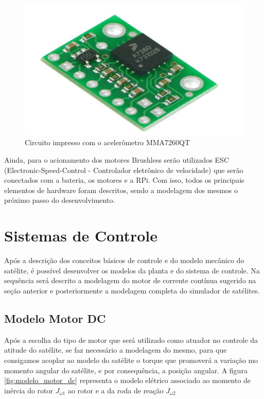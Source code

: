 \begin{figure}[H]
  \caption{Circuito impresso com o acelerômetro MMA7260QT}
  \begin{center}
      \includegraphics[scale=.4]{img/pci_acelerometro_calache_p22}
  \end{center}
  \label{fig:pci_acelerometro_calache_p22}
\end{figure}

Ainda, para o acionamento dos motores Brushless serão utilizados ESC (Electronic-Speed-Control - Controlador eletrônico de velocidade) que serão conectados com a bateria, os motores e a RPi. Com isso, todos os principais elementos de hardware foram descritos, sendo a modelagem dos mesmos o próximo passo do desenvolvimento.


\section{Sistemas de Controle}

Após a descrição dos conceitos básicos de controle e do modelo mecânico do satélite, é possível desenvolver os modelos da planta e do sistema de controle. Na sequência será descrito a modelagem do motor de corrente contínua sugerido na seção anterior e posteriormente a modelagem completa do simulador de satélites.

\subsection{Modelo Motor DC}

Após a escolha do tipo de motor que será utilizado como atuador no controle da atitude do satélite, se faz necessário a modelagem do mesmo, para que consigamos acoplar ao modelo do satélite o torque que promoverá a variação mo momento angular do satélite, e por consequência, a posição angular. A figura \ref{fig:modelo_motor_dc} representa o modelo elétrico associado ao momento de inércia do rotor $J_{\omega 1}$ ao rotor e a da roda de reação $J_{\omega 2}$

